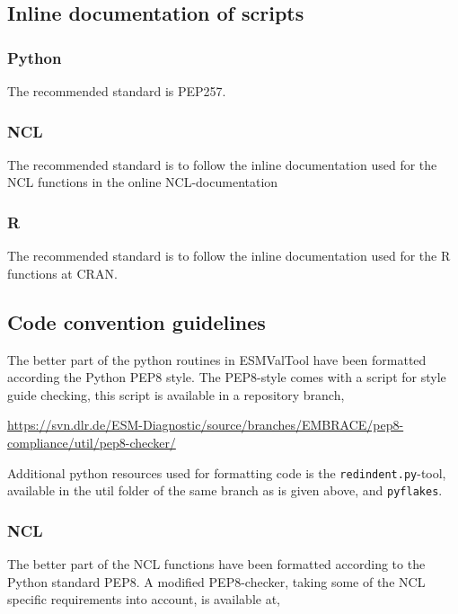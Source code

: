 \documentclass[12pt]{article}
\begin{document}
\subsection{Inline documentation of scripts}
\subsubsection{Python}
The recommended standard is PEP257\cite{pep257:2001}.

\subsubsection{NCL}
The recommended standard is to follow the inline documentation used
for the NCL functions in the online
NCL-documentation\cite{ncar-ncl-homepage}

\subsubsection{R}
The recommended standard is to follow the inline documentation used
for the R functions at CRAN.

\subsection{Code convention guidelines}
The better part of the python routines in ESMValTool have been
formatted according the Python PEP8 style\cite{pep8:2001}. The
PEP8-style comes with a script for style guide checking, this script
is available in a repository branch, 

\begin{sloppypar}
\url{https://svn.dlr.de/ESM-Diagnostic/source/branches/EMBRACE/pep8-compliance/util/pep8-checker/}
\end{sloppypar}

Additional python resources used for formatting code is the
\texttt{redindent.py}-tool, available in the util folder of the same
branch as is given above, and
\texttt{pyflakes}\cite{PyFlakes}.

\subsubsection{NCL}
The better part of the NCL functions have been formatted according to
the Python standard PEP8\cite{pep8:2001}. A modified PEP8-checker,
taking some of the NCL specific requirements into account, is
available at, 
\end{document}
